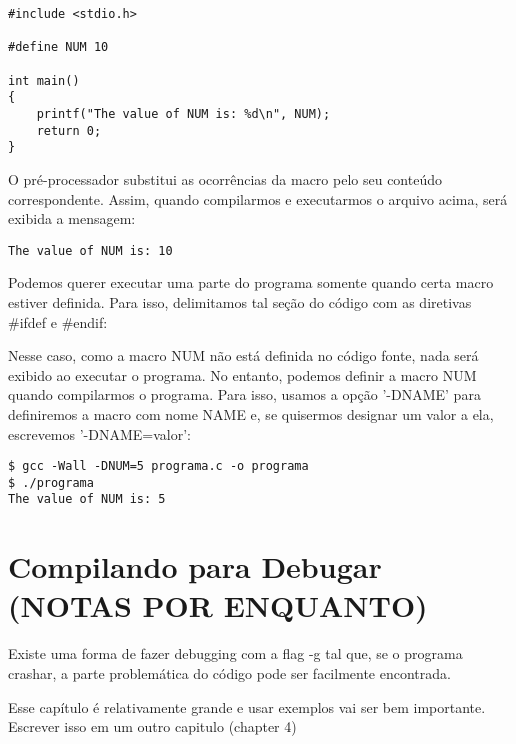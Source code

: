 \begin{scriptsize}
\estiloC
\begin{lstlisting}
#include <stdio.h>

#define NUM 10

int main()
{
    printf("The value of NUM is: %d\n", NUM);
    return 0;
}
\end{lstlisting}
\end{scriptsize}

O pré-processador substitui as ocorrências da macro pelo seu conteúdo correspondente. Assim, quando compilarmos e executarmos o arquivo acima, será exibida a mensagem:

\begin{scriptsize}
\estilobash
\begin{lstlisting}
The value of NUM is: 10
\end{lstlisting}
\end{scriptsize}

Podemos querer executar uma parte do programa somente quando certa macro estiver definida. Para isso, delimitamos tal seção do código com as diretivas \#ifdef e \#endif:


\begin{comment}
\begin{scriptsize}
\estiloC
\begin{lstlisting}
#include <stdio.h>

int main()
{
#ifdef NUM
    printf("The value of NUM is: %d\n", NUM);
#endif
    return 0;
}
\end{lstlisting}
\end{scriptsize}
\end{comment}

Nesse caso, como a macro NUM não está definida no código fonte, nada será exibido ao executar o programa. No entanto, podemos definir a macro NUM quando compilarmos o programa. Para isso, usamos a opção '-DNAME' para definiremos a macro com nome NAME e, se quisermos designar um valor a ela, escrevemos '-DNAME=valor':

\begin{scriptsize}
\estilobash
\begin{lstlisting}
$ gcc -Wall -DNUM=5 programa.c -o programa
$ ./programa
The value of NUM is: 5
\end{lstlisting}
\end{scriptsize}


\section{Compilando para Debugar (NOTAS POR ENQUANTO)}

Existe uma forma de fazer debugging com a flag -g tal que, se o programa crashar, a parte problemática do código pode ser facilmente encontrada.

Esse capítulo é relativamente grande e usar exemplos vai ser bem importante. Escrever isso em um outro capitulo (chapter 4)